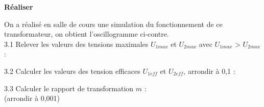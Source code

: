 \documentclass[11pt,a4paper]{article}
\newcommand{\cadreblanc}[1]{%
\medskip\framebox[\linewidth][c]{%
\rule{0mm}{#1mm}}\par
\medskip}
\begin{document}
\dotfill 


 





\textbf{ Réaliser} \\[3mm]

\begin{minipage}{.45\textwidth}%
On a réalisé en salle de cours une simulation du fonctionnement de ce transformateur, on obtient l'oscillogramme ci-contre. \\[3mm]

3.1 Relever les valeurs des tensions maximales $U_{1 max}$ et $U_{2 max} $ avec $U_{1 max}$ > $U_{2 max}$ :

\begin{multicols}{2}
 \dotfill 

 \dotfill 

 \end{multicols}

 
3.2 Calculer les valeurs des tension efficaces $U_{1 eff}$ et $U_{2 eff} $, arrondir à 0,1 : 

\begin{multicols}{2}
 \dotfill 

 \dotfill 

 \end{multicols}

 
\end{minipage}%
\hfill
\begin{minipage}{.40\textwidth}%

\osci[%
scale=0.6,
second channel=1,
screen offset one=0,
screen offset two=0,
time div=5,
voltage div one=200,
voltage div two=20,
sample rate=200,
xy mode=0,
func one=582*sin(2*180/0.020*x),
func two=41*sin(2*180/0.020*x+180),
color one=D62626,
color two=1053AF,
graph back color=FFFFFF,
info back color=D6D6D6,
info text color=000000,
main axis color=000000,
grid color=CCCCCC
]

\end{minipage}%

\vspace{8mm}

\newpage 

\begin{minipage}{.50\textwidth}%
3.3 Calculer le rapport de transformation $m$ : \\(arrondir à 0,001) 
\end{minipage}%
\hfill
\begin{minipage}{.40\textwidth}%
\cadreblanc{15}
\end{minipage}%
\end{document}
